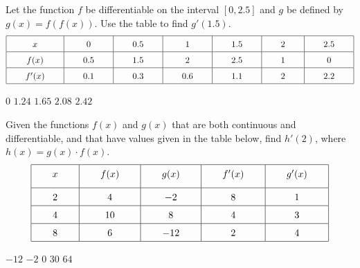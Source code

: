 \begin{questions}
    \question Let the function $f$ be differentiable on the interval $[0, 2.5]$ and $g$ be defined by $g(x) = f(f(x))$. Use the table to find $g'(1.5)$. \begin{align*}
        \arraycolsep=22pt\def\arraystretch{1.5}
        \begin{array}{|c|c|c|c|c|c|c|}
            \hline
            x & 0 & 0.5 & 1 & 1.5 & 2 & 2.5 \\ \hline
            f(x) & 0.5 & 1.5 & 2 & 2.5 & 1 & 0 \\ \hline
            f'(x) & 0.1 & 0.3 & 0.6 & 1.1 & 2 & 2.2 \\
            \hline
        \end{array}
    \end{align*}

    \begin{oneparchoices}
        \choice $0$
        \choice $1.24$
        \choice $1.65$
        \choice $2.08$
        \choice $2.42$
    \end{oneparchoices} \par \horizontalline

    \question Given the functions $f(x)$ and $g(x)$ that are both continuous and differentiable, and that have values given in the table below, find $h'(2)$, where $h(x) = g(x) \cdot f(x)$.  \begin{align*}
        \arraycolsep=22pt\def\arraystretch{1.5}
        \begin{array}{|c|c|c|c|c|}
            \hline
            x & f(x) & g(x) & f'(x) & g'(x) \\[5.5pt] \hline
            2 & 4 & -2 & 8 & 1 \\ \hline
            4 & 10 & 8 & 4 & 3 \\ \hline
            8 & 6 & -12 & 2 & 4 \\
            \hline
        \end{array}
    \end{align*}

    \begin{oneparchoices}
        \choice $-12$
        \choice $-2$
        \choice $0$
        \choice $30$
        \choice $64$
    \end{oneparchoices} \par \horizontalline


\end{questions}
